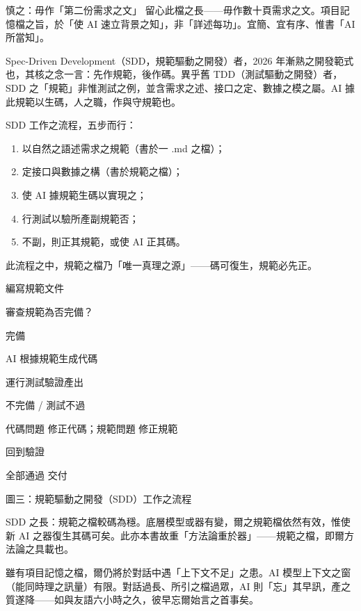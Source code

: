 \begin{tcbwarn}{慎之：毋作「第二份需求之文」}
留心此檔之長——毋作數十頁需求之文。項目記憶檔之旨，於「使 AI 速立背景之知」，非「詳述每功」。宜簡、宜有序、惟書「AI 所當知」。

\end{tcbwarn}


Spec-Driven Development（SDD，規範驅動之開發）者，2026 年漸熟之開發範式也，其核之念一言：先作規範，後作碼。異乎舊 TDD（測試驅動之開發）者，SDD 之「規範」非惟測試之例，並含需求之述、接口之定、數據之模之屬。AI 據此規範以生碼，人之職，作與守規範也。

SDD 工作之流程，五步而行：

\begin{enumerate}
  \item 以自然之語述需求之規範（書於一 .md 之檔）；
  \item 定接口與數據之構（書於規範之檔）；
  \item 使 AI 據規範生碼以實現之；
  \item 行測試以驗所產副規範否；
  \item 不副，則正其規範，或使 AI 正其碼。
\end{enumerate}

此流程之中，規範之檔乃「唯一真理之源」——碼可復生，規範必先正。

編寫規範文件

審查規範為否完備？

完備

AI 根據規範生成代碼

運行測試驗證產出

不完備 / 測試不過

代碼問題 修正代碼；規範問題 修正規範

回到驗證

全部通過 交付

\begin{center}\small\color{gray}圖三：規範驅動之開發（SDD）工作之流程\end{center}

SDD 之長：規範之檔較碼為穩。底層模型或器有變，爾之規範檔依然有效，惟使新 AI 之器復生其碼可矣。此亦本書故重「方法論重於器」——規範之檔，即爾方法論之具載也。


雖有項目記憶之檔，爾仍將於對話中遇「上下文不足」之患。AI 模型上下文之窗（能同時理之訊量）有限。對話過長、所引之檔過眾，AI 則「忘」其早訊，產之質遂降——如與友語六小時之久，彼早忘爾始言之首事矣。

